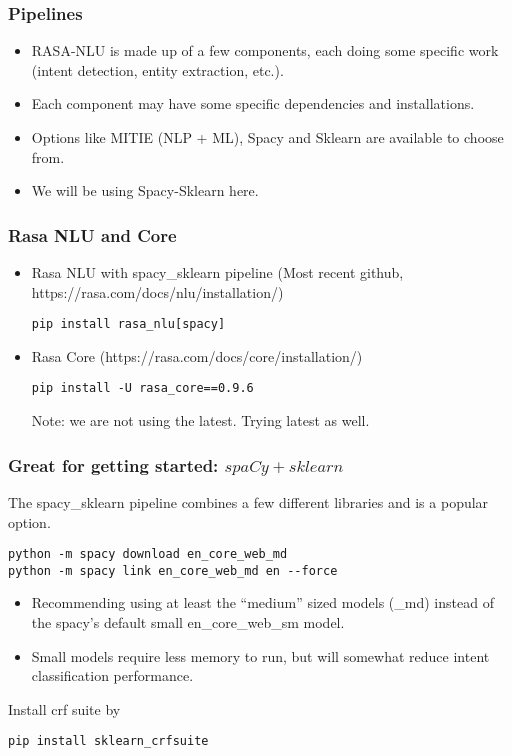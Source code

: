  \begin{frame}[fragile]\frametitle{Pipelines}
\begin{itemize}
\item RASA-NLU is made up of a few components, each doing some specific work (intent detection, entity extraction, etc.). 
\item Each component may have some specific dependencies and installations. 
\item Options like MITIE (NLP + ML), Spacy and Sklearn are available to choose from. 
\item We will be using Spacy-Sklearn here.
\end{itemize}

\end{frame}
 \begin{frame}[fragile]\frametitle{Rasa NLU and Core}
\begin{itemize}
\item Rasa NLU  with spacy\_sklearn pipeline (Most recent github, https://rasa.com/docs/nlu/installation/)
\begin{lstlisting}
pip install rasa_nlu[spacy]
\end{lstlisting}
\item Rasa Core (https://rasa.com/docs/core/installation/)
\begin{lstlisting}
pip install -U rasa_core==0.9.6
\end{lstlisting}
Note: we are not using the latest. Trying latest as well.
\end{itemize}
\end{frame}


 \begin{frame}[fragile]\frametitle{Great for getting started: $spaCy + sklearn$}
 The spacy\_sklearn pipeline combines a few different libraries and is a popular option.

\begin{lstlisting}
python -m spacy download en_core_web_md
python -m spacy link en_core_web_md en --force
\end{lstlisting}

\begin{itemize}
\item Recommending using at least the ``medium'' sized models (\_md) instead of the spacy's default small en\_core\_web\_sm model. 
\item Small models require less memory to run, but will somewhat reduce intent classification performance.
\end{itemize}
Install crf suite by 
\begin{lstlisting}
pip install sklearn_crfsuite
\end{lstlisting}
\end{frame}

